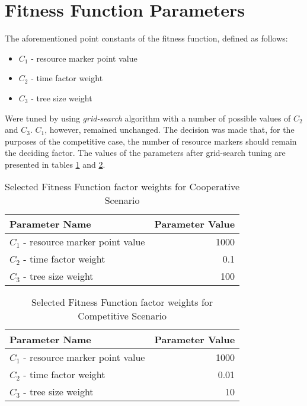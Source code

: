 \section{Fitness Function Parameters}
\label{section_fitness_function_tuning}
The aforementioned point constants of the fitness function, defined as follows:
\begin{itemize}
    \item $C_1$ - resource marker point value
    \item $C_2$ - time factor weight
    \item $C_3$ - tree size weight
\end{itemize}
Were tuned by using \textit{grid-search} algorithm with a number of possible values of $C_2$ and $C_3$. $C_1$, however, remained unchanged. The decision was made that, for the purposes of the competitive case, the number of resource markers should remain the deciding factor.
The values of the parameters after grid-search tuning are presented in tables \ref{table:x tunedfitnessfunctionparameterscoop} and \ref{table:x tunedfitnessfunctionparameterscomp}.
\begin{table} [h]
    \centering
    \begin{tabular} {l r}
        \hline \hline
        Parameter Name & Parameter Value \\
        \hline
        $C_1$ - resource marker point value & 1000 \\
        $C_2$ - time factor weight & 0.1 \\
        $C_3$ - tree size weight & 100 \\
    \end{tabular}
    \caption{Selected Fitness Function factor weights for Cooperative Scenario}
    \label{table:x tunedfitnessfunctionparameterscoop}
\end{table}


\begin{table} [h]
    \centering
    \begin{tabular} {l r}
        \hline \hline
        Parameter Name & Parameter Value \\
        \hline
        $C_1$ - resource marker point value & 1000 \\
        $C_2$ - time factor weight & 0.01 \\
        $C_3$ - tree size weight & 10 \\
    \end{tabular}
    \caption{Selected Fitness Function factor weights for Competitive Scenario}
    \label{table:x tunedfitnessfunctionparameterscomp}
\end{table}

